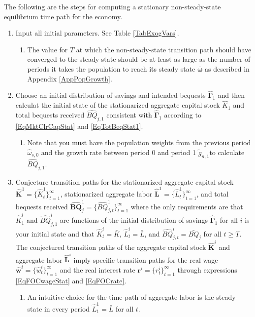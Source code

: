   The following are the steps for computing a stationary non-steady-state equilibrium time path for the economy.
  \begin{enumerate}
    \item Input all initial parameters. See Table \ref{TabExogVars}.
      \begin{enumerate}
        \item The value for $T$ at which the non-steady-state transition path should have converged to the steady state should be at least as large as the number of periods it takes the population to reach its steady state $\bm{\bar{\omega}}$ as described in Appendix \ref{AppPopGrowth}.
      \end{enumerate}

    \item Choose an initial distribution of savings and intended bequests $\bm{\hat{\Gamma}}_1$ and then calculat the initial state of the stationarized aggregate capital stock $\hat{K}_1$ and total bequests received $\hat{BQ}_{j,1}$ consistent with $\bm{\hat{\Gamma}}_1$ according to \eqref{EqMktClrCapStat} and \eqref{EqTotBeqStat1}.
      \begin{enumerate}
        \item Note that you must have the population weights from the previous period $\hat{\omega}_{s,0}$ and the growth rate between period 0 and period 1 $\tilde{g}_{n,1}$to calculate $\hat{BQ}_{j,1}$.
      \end{enumerate}
    \item Conjecture transition paths for the stationarized aggregate capital stock $\bm{\hat{K}}^1=\{\hat{K}^1_t\}_{t=1}^\infty$, stationarized aggregate labor $\bm{\hat{L}}^1=\{\hat{L}^1_t\}_{t=1}^\infty$, and total bequests received $\bm{\hat{BQ}}_j^1=\{\hat{BQ}^{1}_{j,t}\}_{t=1}^\infty$ where the only requirements are that $\hat{K}^i_1$ and $\hat{BQ}^i_{j,1}$ are functions of the initial distribution of savings $\bm{\hat{\Gamma}}_1$ for all $i$ is your initial state and that $\hat{K}^i_t=\bar{K}$, $\hat{L}^i_t=\bar{L}$, and $\hat{BQ}^i_{j,t}= \bar{BQ}_j$ for all $t\geq T$. The conjectured transition paths of the aggregate capital stock $\bm{\hat{K}}^i$ and aggregate labor $\bm{\hat{L}}^i$ imply specific transition paths for the real wage $\bm{\hat{w}}^i=\{\hat{w}^i_t\}_{t=1}^\infty$ and the real interest rate $\bm{r}^i=\{r^i_t\}_{t=1}^\infty$ through expressions \eqref{EqFOCwageStat} and \eqref{EqFOCrate}.
      \begin{enumerate}
        \item An intuitive choice for the time path of aggregate labor is the steady-state in every period $\hat{L}^1_t = \bar{L}$ for all $t$.

\end{enumerate}
\end{enumerate}
